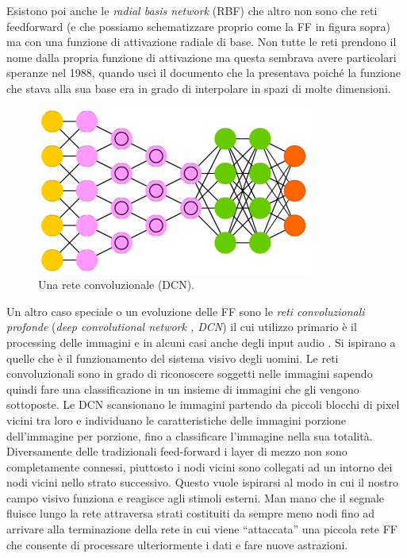Esistono poi anche le \textit{radial basis network} (RBF) che altro non sono che reti feedforward (e che possiamo schematizzare proprio come la FF in figura sopra) ma con una funzione di attivazione radiale di base. Non tutte le reti prendono il nome dalla propria funzione di attivazione ma questa sembrava avere particolari speranze nel 1988, quando uscì il documento che la presentava poiché la funzione che stava alla sua base era in grado di interpolare in spazi di molte dimensioni\cite{broomhead1988radial}.
 
\begin{figure}
\includegraphics[scale=0.7]{media_tesi/DCN.png}
\caption{Una rete convoluzionale (DCN).}\label{wrap-fig:1}
\end{figure} 
Un altro caso speciale o un evoluzione delle FF sono le \textit{reti convoluzionali profonde} (\textit{deep convolutional network , DCN}) il cui utilizzo primario è il processing delle immagini e in alcuni casi anche degli input audio \cite{lecun1998gradient}. Si ispirano a quelle che è il funzionamento del sistema visivo degli uomini.
Le reti convoluzionali sono in grado di riconoscere soggetti nelle immagini sapendo quindi fare una classificazione in un insieme di immagini che gli vengono sottoposte. Le DCN scansionano le immagini partendo da piccoli blocchi di pixel vicini tra loro e individuano le caratteristiche delle immagini porzione dell'immagine per porzione, fino a classificare l'immagine nella sua totalità.
Diversamente delle tradizionali feed-forward i layer di mezzo non sono completamente connessi, piuttosto i nodi vicini sono collegati ad un intorno dei nodi vicini nello strato successivo. Questo vuole ispirarsi al modo in cui il nostro campo visivo funziona e reagisce agli stimoli esterni. Man mano che il segnale fluisce lungo la rete attraversa strati costituiti da sempre meno nodi fino ad arrivare alla terminazione della rete in cui viene ``attaccata'' una piccola rete FF che consente di processare ulteriormente i dati e fare nuove astrazioni.


